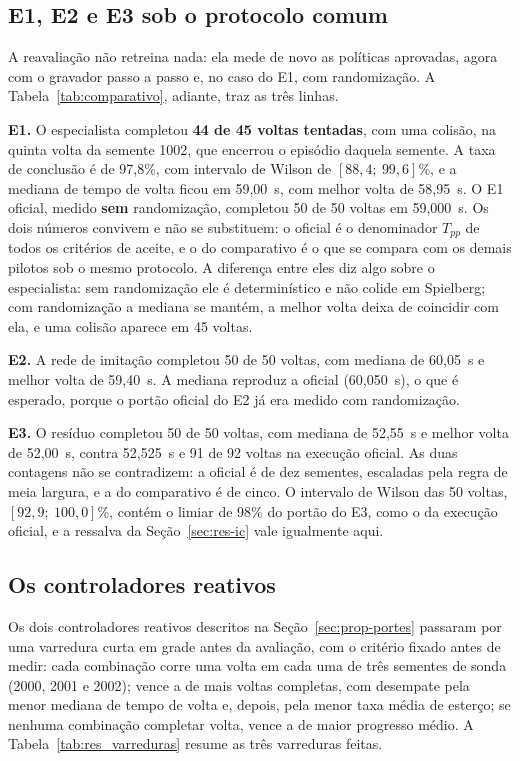 \subsection{E1, E2 e E3 sob o protocolo comum}\label{sec:res-cmp-reavaliacao}

A reavaliação não retreina nada: ela mede de novo as políticas aprovadas, agora
com o gravador passo a passo e, no caso do E1, com randomização. A
Tabela~\ref{tab:comparativo}, adiante, traz as três linhas.

\textbf{E1.} O especialista completou \textbf{44 de 45 voltas tentadas}, com uma
colisão, na quinta volta da semente 1002, que encerrou o episódio daquela
semente. A taxa de conclusão é de 97,8\%, com intervalo de Wilson de
$[88{,}4;\ 99{,}6]$\%, e a mediana de tempo de volta ficou em 59,00~s, com melhor
volta de 58,95~s. O E1 oficial, medido \textbf{sem} randomização, completou 50 de
50 voltas em 59,000~s. Os dois números convivem e não se substituem: o oficial é o
denominador $T_{pp}$ de todos os critérios de aceite, e o do comparativo é o que
se compara com os demais pilotos sob o mesmo protocolo. A diferença entre eles
diz algo sobre o especialista: sem randomização ele é determinístico e não
colide em Spielberg; com randomização a mediana se mantém, a melhor volta deixa
de coincidir com ela, e uma colisão aparece em 45 voltas.

\textbf{E2.} A rede de imitação completou 50 de 50 voltas, com mediana de
60,05~s e melhor volta de 59,40~s. A mediana reproduz a oficial (60,050~s), o
que é esperado, porque o portão oficial do E2 já era medido com randomização.

\textbf{E3.} O resíduo completou 50 de 50 voltas, com mediana de 52,55~s e
melhor volta de 52,00~s, contra 52,525~s e 91 de 92 voltas na execução oficial.
As duas contagens não se contradizem: a oficial é de dez sementes, escaladas pela
regra de meia largura, e a do comparativo é de cinco. O intervalo de Wilson das
50 voltas, $[92{,}9;\ 100{,}0]$\%, contém o limiar de 98\% do portão do E3, como o
da execução oficial, e a ressalva da Seção~\ref{sec:res-ic} vale igualmente
aqui.

\subsection{Os controladores reativos}\label{sec:res-cmp-reativos}

Os dois controladores reativos descritos na Seção~\ref{sec:prop-portes} passaram
por uma varredura curta em grade antes da avaliação, com o critério fixado antes
de medir: cada combinação corre uma volta em cada uma de três sementes de sonda
(2000, 2001 e 2002); vence a de mais voltas completas, com desempate pela menor
mediana de tempo de volta e, depois, pela menor taxa média de esterço; se
nenhuma combinação completar volta, vence a de maior progresso médio. A
Tabela~\ref{tab:res_varreduras} resume as três varreduras feitas.

